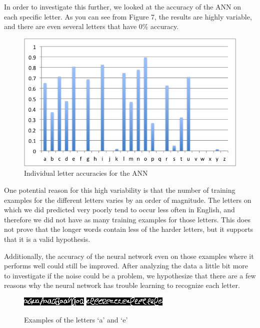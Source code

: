 \documentclass[11pt,a4paper,twocolumn]{article}
\begin{document}
In order to investigate this further, we looked at the accuracy of the ANN on each specific letter.
As you can see from Figure 7, the results are highly variable, and there are even several letters
that have 0\% accuracy.

\begin{figure}[h]
\centering
\caption{Individual letter accuracies for the ANN}
\includegraphics[scale=0.55]{img/letterPercentages.png}
\end{figure} 

One potential reason for this high variability is that the number of training examples for the
different letters varies by an order of magnitude. The letters on which we did predicted very poorly
tend to occur less often in English, and therefore we did not have as many training examples for
those letters. This does not prove that the longer words contain less of the harder letters, but it
supports that it is a valid hypothesis. 

Additionally, the accuracy of the neural network even on those examples where
it performs well could still be improved. After analyzing the data a little bit
more to investigate if the noise could be a problem, we hypothesize that there
are a few reasons why the neural network has trouble learning to recognize each
letter. 

\begin{figure}[h]
\centering
\caption{Examples of the letters `a' and `e'}
\includegraphics[scale=1.0]{img/aa.jpg}
\includegraphics[scale=1.0]{img/ee.jpg}
\end{figure}
\end{document}
